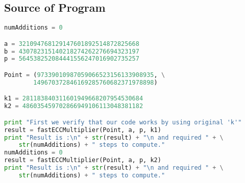 \documentclass[a4paper]{article}
\begin{document}
\subsection*{Source of Program}

\begin{lstlisting}[language=Python]
numAdditions = 0

a = 321094768129147601892514872825668
b = 430782315140218274262276694323197
p = 564538252084441556247016902735257

Point = (97339010987059066523156133908935, \
		149670372846169285760682371978898)

k1 = 281183840311601949668207954530684
k2 = 486035459702866949106113048381182

print "First we verify that our code works by using original 'k'"
result = fastECCMultiplier(Point, a, p, k1)
print "Result is :\n" + str(result) + "\n and required " + \
	str(numAdditions) + " steps to compute."
numAdditions = 0
result = fastECCMultiplier(Point, a, p, k2)
print "Result is :\n" + str(result) + "\n and required " + \
	str(numAdditions) + " steps to compute."
\end{lstlisting}





\end{document}
